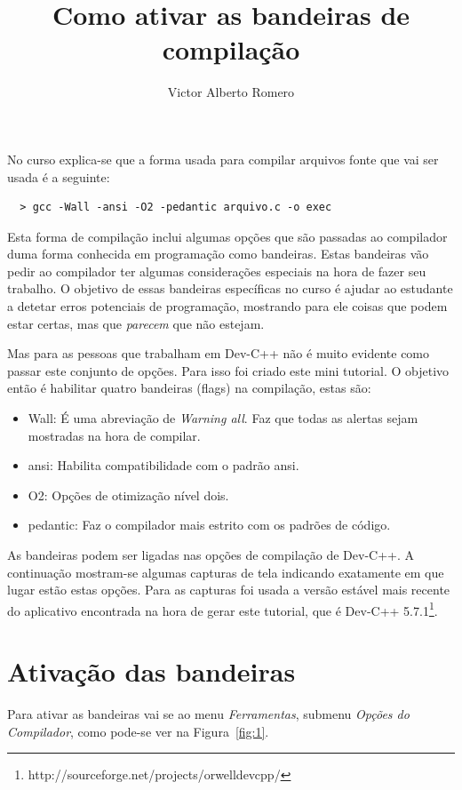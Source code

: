 \documentclass[12pt, a4paper]{article}
\author{Victor Alberto Romero}
\title{Como ativar as bandeiras de compilação}
\begin{document}
\maketitle

No curso explica-se que a forma usada para compilar arquivos fonte que vai ser usada é a seguinte:

\begin{verbatim}
  > gcc -Wall -ansi -O2 -pedantic arquivo.c -o exec
\end{verbatim}

Esta forma de compilação inclui algumas opções que são passadas ao compilador duma forma conhecida em programação como bandeiras. Estas bandeiras vão pedir ao compilador ter algumas considerações especiais na hora de fazer seu trabalho. O objetivo de essas bandeiras específicas no curso é ajudar ao estudante a detetar erros potenciais de programação, mostrando para ele coisas que podem estar certas, mas que \textit{parecem} que não estejam.

Mas para as pessoas que trabalham em Dev-C++ não é muito evidente como passar este conjunto de opções. Para isso foi criado este mini tutorial. O objetivo então é habilitar quatro bandeiras (flags) na compilação, estas são:

\begin{itemize}
  \item Wall: É uma abreviação de \textit{Warning all}. Faz que todas as alertas sejam mostradas na hora de compilar.
  \item ansi: Habilita compatibilidade com o padrão ansi.
  \item O2: Opções de otimização nível dois.
  \item pedantic: Faz o compilador mais estrito com os padrões de código.
\end{itemize}

As bandeiras podem ser ligadas nas opções de compilação de Dev-C++. A continuação mostram-se algumas capturas de tela indicando exatamente em que lugar estão estas opções. Para as capturas foi usada a versão estável mais recente do aplicativo encontrada na hora de gerar este tutorial, que é Dev-C++ 5.7.1\footnote{http://sourceforge.net/projects/orwelldevcpp/}.

\section*{Ativação das bandeiras}

Para ativar as bandeiras vai se ao menu \emph{Ferramentas}, submenu \emph{Opções do Compilador}, como pode-se ver na Figura~\ref{fig:1}.
\end{document}
